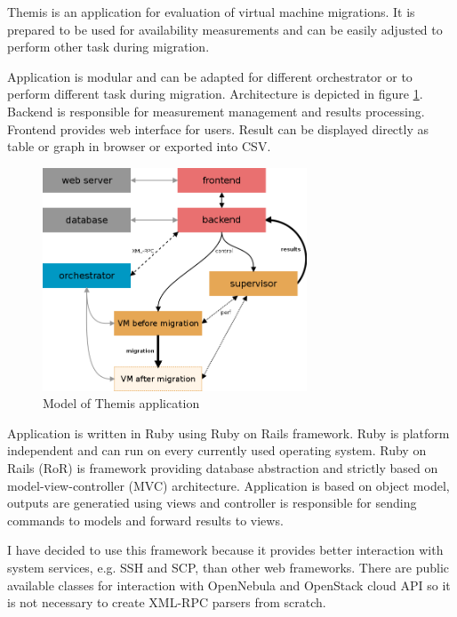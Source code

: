 
Themis is an application for evaluation of virtual machine migrations. It is prepared to be used for availability measurements and can be easily adjusted to perform other task during migration. 

Application is modular and can be adapted for different orchestrator or to perform different task during migration. Architecture is depicted in figure \ref{img:themis-model}. Backend is responsible for measurement management and results processing. Frontend provides web interface for users. Result can be displayed directly as table or graph in browser or exported into \Ac{CSV}.

\begin{figure}[htb]
	\begin{center}
	\includegraphics[width=0.7\textwidth]{themis-model.png}
	\end{center}
	\caption{Model of Themis application}
	\label{img:themis-model}
\end{figure}



Application is written in Ruby using Ruby on Rails framework. Ruby is platform independent and can run on every currently used operating system. Ruby on Rails (\Ac{RoR}) is framework providing database abstraction and strictly based on model-view-controller (\Ac{MVC}) architecture. Application is based on object model, outputs are generatied using views and controller is responsible for sending commands to models and forward results to views.

I have decided to use this framework because it provides better interaction with system services, e.g. \Ac{SSH} and \Ac{SCP}, than other web frameworks. There are public available classes for interaction with OpenNebula and OpenStack cloud \Ac{API} so it is not necessary to create \mbox{\Ac{XML}-\Ac{RPC}} parsers from scratch.

